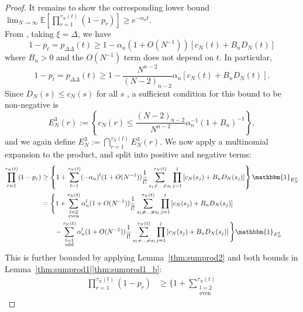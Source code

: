 \documentclass{article}
\newcommand{\E}{\mathbb{E}}
\newcommand{\1}[1]{\mathbbm{1}_{#1}}
\begin{document}
\begin{proof}
It remains to show the corresponding lower bound
$\lim_{N\to\infty}\E\left[ \prod_{r=1}^{\tau_N(t)} (1-p_r) \right] 
\geq e^{-\alpha_n t}$.\\
From \citet[Equation (3.14)]{brown2021}, taking $\xi=\Delta$, we have
\begin{equation}\label{eq:023}
1-p_t 
= p_{\Delta\Delta}(t) \geq 1 - \alpha_n (1+O(N^{-1})) 
        \left[c_N(t) + B_n D_N(t) \right]
\end{equation}
where $B_n >0$ and the $O(N^{-1})$ term does not depend on $t$.
In particular,
\begin{equation}
1-p_t
= p_{\Delta\Delta}(t) \geq 1 - \frac{N^{n-2}}{(N-2)_{n-2}} \alpha_n 
    [ c_N(t) + B_n D_N(t) ] .
\end{equation}
Since $D_N(s) \leq c_N(s)$ for all $s$ \citep[p.9]{koskela2018}, a sufficient condition for this bound to be non-negative is
\begin{equation}\label{eq:025}
E_N^3(r)
:= \left\{ c_N(r) \leq \frac{(N-2)_{n-2}}{N^{n-2}} 
        \alpha_n^{-1} (1+B_n)^{-1} \right\} ,
\end{equation}
and we again define $E_N^3 := \bigcap_{r=1}^{\tau_N(t)} E_N^3(r)$.
We now apply a multinomial expansion to the product, and split into positive and negative terms:
\begin{align}
\prod_{r=1}^{\tau_N(t)} (1-p_r)
&\geq \left\{ 1 + \sum_{l=1}^{\tau_N(t)} (-\alpha_n)^l (1+O(N^{-1})) 
        \frac{1}{l!} \sum_{s_1\neq\dots\neq s_l}^{\tau_N(t)}\prod_{j=1}^l
        \left[ c_N(s_j) + B_n D_N(s_j) \right] \right\} \1{E_N^3} \notag\\
&= \Bigg\{ 1 + \sum_{\substack{l=2 \\ \text{even} }}^{\tau_N(t)} 
        \alpha_n^l (1+O(N^{-1})) \frac{1}{l!} 
        \sum_{s_1\neq\dots\neq s_l}^{\tau_N(t)}\prod_{j=1}^l
        \left[ c_N(s_j) + B_n D_N(s_j) \right] \notag\\
    &\qquad- \sum_{\substack{l=1 \\ \text{odd} }}^{\tau_N(t)} 
        \alpha_n^l (1+O(N^{-1})) \frac{1}{l!}
        \sum_{s_1\neq\dots\neq s_l}^{\tau_N(t)}\prod_{j=1}^l
        \left[ c_N(s_j) + B_n D_N(s_j) \right] \Bigg\} \1{E_N^3}
\end{align}
This is further bounded by applying Lemma~\ref{thm:sumprod2} and both bounds in Lemma~\ref{thm:sumprod1}\ref{thm:sumprod1_b}:
\begin{align}
\prod_{r=1}^{\tau_N(t)} (1-p_r)
&\geq \Bigg\{ 1 + \sum_{\substack{l=2 \\ \text{even} }}^{\tau_N(t)} 

\end{align}
\end{proof}
\end{document}
